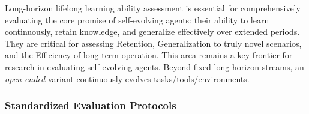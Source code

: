 Long-horizon lifelong learning ability assessment is essential for comprehensively evaluating the core promise of self-evolving agents: their ability to learn continuously, retain knowledge, and generalize effectively over extended periods. They are critical for assessing Retention, Generalization to truly novel scenarios, and the Efficiency of long-term operation. This area remains a key frontier for research in evaluating self-evolving agents. Beyond fixed long-horizon streams, an \emph{open-ended} variant continuously evolves tasks/tools/environments.






\subsubsection{Standardized Evaluation Protocols}

